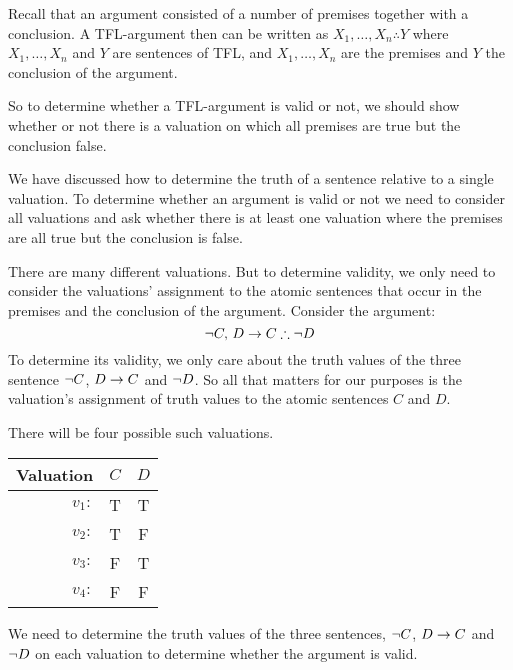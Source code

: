 Recall that an argument consisted of a number of premises together with a conclusion. A TFL-argument then can be written as $X_1,\ldots,X_n\therefore Y$ where $X_1,\ldots,X_n$ and $Y$ are sentences of TFL, and $X_1,\ldots,X_n$ are the premises and $Y$ the conclusion of the argument.


So to determine whether a TFL-argument is valid or not, we should show whether or not there is a valuation on which all premises are true but the conclusion false. 

We have discussed how to determine the truth of a sentence relative to a single valuation. To determine whether an argument is valid or not we need to consider all valuations and ask whether there is at least one valuation where the premises are all true but the conclusion is false. 

There are many different valuations. But to determine validity, we only need to consider the valuations' assignment to the atomic sentences that occur in the premises and the conclusion of the argument. Consider the argument:
$$\enot C,\,D\eif C\therefore\enot  D$$
To determine its validity, we only care about the truth values of the three sentence $\neg C$, $D\rightarrow C$ and $\neg D$. So all that matters for our purposes is the valuation's assignment of truth values to the atomic sentences $C$ and $D$.

There will be four possible such valuations. 
\begin{center}
	\begin{tabular}{rcc}
		Valuation&$C$&$D$\\\hline
		$v_1:$&T & T \\
		$v_2:$&T & F \\
		$v_3:$&F & T \\
		$v_4:$&F & F \\
	\end{tabular}
\end{center}

We need to determine the truth values of the three sentences, $\neg C$, $D\rightarrow C$ and $\neg D$ on each valuation to determine whether the argument is valid. 

